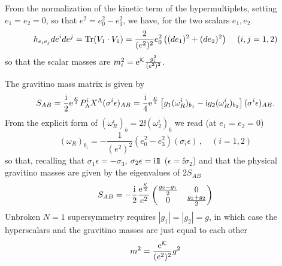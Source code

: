 \documentclass[a4paper,12pt]{article}
\begin{document}
From the normalization of the kinetic term of the hypermultiplets, setting $e_1 =e_2 =0$, so that $e^2 = e_0^2 - e_3^2$, we have, for the two scalars $e_1, e_2$ 
  \begin{equation}
h_{e_i e_j }de^i de^j = {\rm Tr}(V_1\cdot V_1) = \frac 2{(e^2)^2}
e_0^2 \left((de_1)^2 + (de_2)^2\right) \, \quad (i,j=1,2)
\end{equation}
so that the scalar masses are $ m_i^2 = {\rm e}^{\mathcal K} \frac{g_i^2}{(e^2)^2}$.



The gravitino mass matrix is given by \cite{abcdffm}
\begin{equation}
S_{AB} =\frac {\mathrm{i}} 2 {\rm e}^{\frac{\mathcal K}2}P^i_\Lambda X^\Lambda (\sigma^i\epsilon )_{AB}=\frac {\mathrm{i}} 4 {\rm e}^{\frac{\mathcal K}2}
\left[ g_1 (\omega^i_R)_{b_1} -\mathrm{i} g_2 (\omega^i_R)_{b_2}\right](\sigma^i\epsilon )_{AB}.
\end{equation}
From the explicit form of $(\omega^i_R)_b = 2\ii(\omega^i_2)_b$ 
  we read (at $e_1=e_2=0$) 
\begin{equation}
(\omega_R)_{b_i} =- \frac 1{(e^2)^2} (e_0^2 - e_3^2) (\sigma_i \epsilon)  \, , \quad (i =1,2)
\end{equation}
so that,  recalling that
$\sigma_1 \epsilon = -\sigma_3$,  $\sigma_2 \epsilon = \mathrm{i} \relax{\rm 1\kern-.35em 1}$
($\epsilon = \ii \sigma_2$) and that the physical gravitino masses are given by the eigenvalues of $2S_{AB}$
\begin{equation}
S_{AB} = -\frac {\mathrm{i}} 2\frac{ {\rm e}^{\frac{\mathcal K}2}}{e^2}
\begin{pmatrix} \frac{g_2 -g_1}2 & 0 \cr 0 & \frac{g_1 + g_2}2 \cr \end{pmatrix}
\end{equation}
Unbroken $N=1$ supersymmetry requires $|g_1|=|g_2|= g$, in which case 
the hyperscalars and the gravitino masses are just equal to each other
\begin{equation}
m^2 = \frac  {{\rm e}^{\mathcal K}}  {(e^2)^2}g^2
\end{equation}
\end{document}

